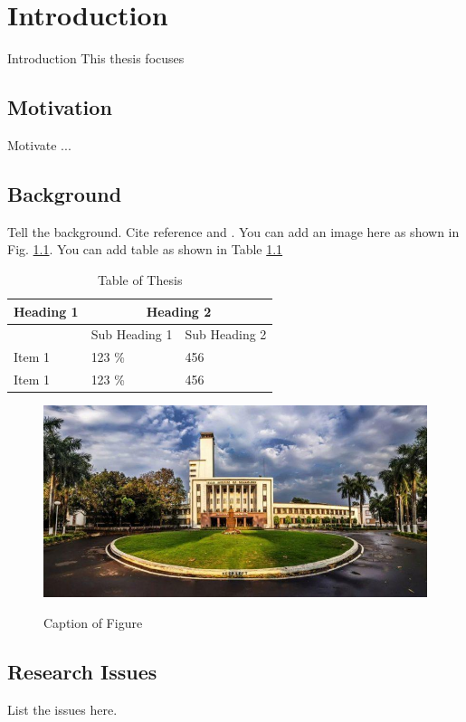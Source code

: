 \chapter[Introduction]{Introduction}{Introduction}
\label{chap:intro}
{\Huge \calligra T}his thesis focuses 

\section{Motivation}
Motivate ...

\section{Background}
Tell the background. Cite reference \cite{samanta2020direct} and \cite{samanta2018fast}. You can add an image here as shown in Fig. \ref{figure:labelName}. You can add table as shown in Table \ref{Table:labelOfTable}

\begin{table}[h]
	\renewcommand{\arraystretch}{1.3}
	\caption{Table of Thesis} \label{Table:labelOfTable} \centering
	\begin{tabular}{l|l|l}
		\hline \hline
		Heading 1           & \multicolumn{2}{c}{Heading 2}   \\ \hline
		& Sub Heading 1 & Sub Heading 2     \\ \hline
		Item 1      & 123 \%       & 456 \\
		Item 1      & 123 \%       & 456 \\
		\hline
	\end{tabular}
\end{table}

\begin{figure}[h] 
	\centering
	{\includegraphics[width=120mm]{Chapter_intro/figs/img1}}
	\caption{Caption of Figure} \label{figure:labelName}
\end{figure}

\section{Research Issues}
List the issues here.

